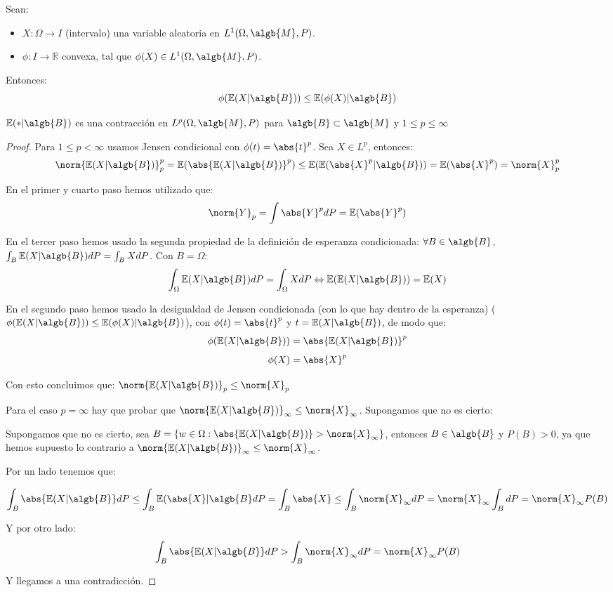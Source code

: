\documentclass{apuntes}
\begin{document}
\begin{defn}
Sean:
\begin{itemize}
\item $X: \Omega \rightarrow I$ (intervalo) una variable aleatoria en $L^1(\Omega, \algb{M},P)$.
\item $\phi: I \rightarrow \mathbb{R}$ convexa, tal que $\phi(X) \in L^1(\Omega,\algb{M},P)$.
\end{itemize}
Entonces:
\[
\phi(\mathbb{E}(X|\algb{B})) \leq \mathbb{E}(\phi(X)|\algb{B})
\]
\end{defn}

\begin{theorem}
$\mathbb{E}(*|\algb{B})$ es una contracción en $L^p(\Omega, \algb{M}, P)$ para $\algb{B}\subset\algb{M}$ y $1\leq p\leq\infty$
\end{theorem}
\begin{proof}
Para $1\leq p < \infty$ usamos Jensen condicional con $\phi(t)=\abs{t}^p$. Sea $X \in L^p$, entonces:
\[
\norm{\mathbb{E}(X|\algb{B})}_p^p = \mathbb{E}(\abs{\mathbb{E}(X|\algb{B})}^p) \leq  \mathbb{E}(\mathbb{E}(\abs{X}^p|\algb{B})) = \mathbb{E}(\abs{X}^p) = \norm{X}_p^p
\]

En el primer y cuarto paso hemos utilizado que:
\[
\norm{Y}_p = \int \abs{Y}^pdP =\mathbb{E}(\abs{Y}^p)
\]

En el tercer paso hemos usado la segunda propiedad de la definición de esperanza condicionada: $\forall B \in \algb{B}$, $\int_{B}\mathbb{E}(X|\algb{B})dP=\int_{B}XdP$. Con $B=\Omega$:
\[
\int_{\Omega}\mathbb{E}(X|\algb{B})dP=\int_{\Omega}XdP \Leftrightarrow \mathbb{E}(\mathbb{E}(X|\algb{B}))=\mathbb{E}(X)
\]


En el segundo paso hemos usado la desigualdad de Jensen condicionada (con lo que hay dentro de la esperanza) ($\phi(\mathbb{E}(X|\algb{B})) \leq \mathbb{E}(\phi(X)|\algb{B})$), con $\phi(t)=\abs{t}^p$ y $t=\mathbb{E}(X|\algb{B})$, de modo que:
\[
\phi(\mathbb{E}(X|\algb{B})) = \abs{\mathbb{E}(X|\algb{B})}^p
\]
\[
\phi(X) = \abs{X}^p
\]

Con esto concluimos que: $\norm{\mathbb{E}(X|\algb{B})}_p \leq \norm{X}_p$

Para el caso $p=\infty$ hay que probar que $\norm{\mathbb{E}(X|\algb{B})}_{\infty} \leq \norm{X}_{\infty}$. Supongamos que no es cierto:


Supongamos que no es cierto, sea $B=\{w \in \Omega: \abs{\mathbb{E}(X|\algb{B})}>\norm{X}_{\infty}\}$, entonces $B \in \algb{B}$ y $P(B) > 0$, ya que hemos supuesto lo contrario a $\norm{\mathbb{E}(X|\algb{B})}_{\infty} \leq \norm{X}_{\infty}$.

Por un lado tenemos que:

\[
\int_B \abs{\mathbb{E}(X|\algb{B}} dP \leq \int_B \mathbb{E}(\abs{X}|\algb{B} dP = \int_B \abs{X} \leq \int_B \norm{X}_{\infty} dP = \norm{X}_{\infty}\int_BdP=\norm{X}_{\infty}P(B)
\]

Y por otro lado:
\[
\int_B \abs{\mathbb{E}(X|\algb{B}} dP > \int_B \norm{X}_{\infty}dP = \norm{X}_{\infty}P(B)
\]

Y llegamos a una contradicción.
\end{proof}
\end{document}
